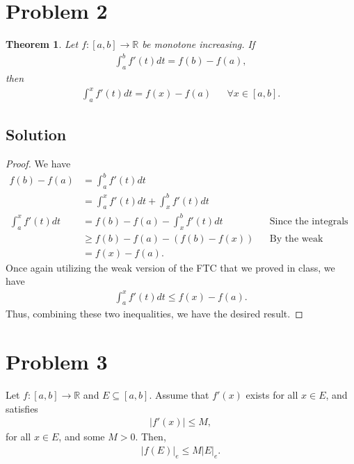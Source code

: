 \documentclass[10pt,a4paper]{article}
\theoremstyle{theorem}
\newtheorem{theorem}{Theorem}
\theoremstyle{definition}
\begin{document}
\section*{Problem 2}
\begin{theorem}
Let $f:[a,b] \to \mathbb{R}$ be monotone increasing. If 
\begin{align*}
\int_a^b f'(t)dt = f(b) - f(a),
\end{align*}
then
\begin{align*}
\int_a^x f'(t)dt = f(x) - f(a) && \forall x \in [a, b].
\end{align*}
\end{theorem}

\subsection*{Solution}
\begin{proof}
We have
\begin{align*}
f(b) - f(a) &= \int_a^b f'(t)dt\\
&= \int_a^x f'(t)dt + \int_x^b f'(t)dt\\
\int_a^x f'(t)dt &= f(b) - f(a) - \int_x^b f'(t)dt &&\text{Since the integrals are finite}\\
&\geq f(b) - f(a) - (f(b) - f(x)) &&\text{By the weak version of FTC}\\
&= f(x) - f(a).
\end{align*}
Once again utilizing the weak version of the FTC that we proved in class, we have
\begin{align*}
\int_a^x f'(t)dt \leq f(x) - f(a).
\end{align*}
Thus, combining these two inequalities, we have the desired result.
\end{proof}

\section*{Problem 3}
Let $f:[a,b] \to \mathbb{R}$ and $E \subseteq [a, b]$. Assume that $f'(x)$ exists for all $x \in E$, and satisfies 
\begin{align*}
|f'(x)| \leq M,
\end{align*}
for all $x \in E$, and some $M > 0$. Then,
\begin{align*}
|f(E)|_e \leq M |E|_e.
\end{align*}
\end{document}
